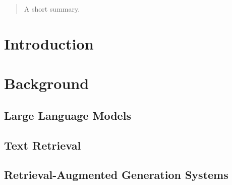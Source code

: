 \documentclass[english,master]{swsLeipzig}
\begin{document}
\begin{frontmatter}
  \begin{abstract}
    A short summary.
  \end{abstract}

  \tableofcontents





\end{frontmatter}

\chapter{Introduction}\label{chap:introduction}


\chapter{Background}\label{chap:background}


\section{Large Language Models}\label{sec:llm}


\section{Text Retrieval}\label{sec:retrieval}


% 

\section{Retrieval-Augmented Generation Systems}\label{sec:rag}

\end{document}
